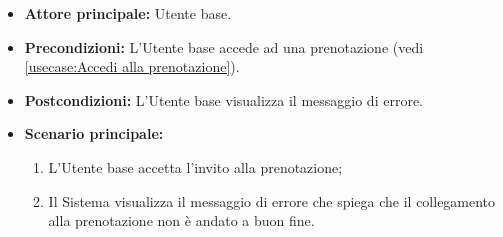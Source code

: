 \label{usecase:Accesso prenotazione fallito}
\begin{itemize}
	\item \textbf{Attore principale:} Utente base.

	\item \textbf{Precondizioni:}
	      L'Utente base accede ad una prenotazione (vedi \autoref{usecase:Accedi alla prenotazione}).

	\item \textbf{Postcondizioni:}
	      L'Utente base visualizza il messaggio di errore.

	\item \textbf{Scenario principale:}
	      \begin{enumerate}
		      \item L'Utente base accetta l'invito alla prenotazione;

		      \item Il Sistema visualizza il messaggio di errore che spiega che il collegamento alla prenotazione non è andato a buon fine.
	      \end{enumerate}
\end{itemize}